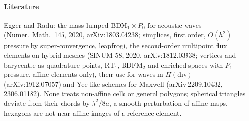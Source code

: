\documentclass[11pt,a4paper]{article}
\begin{document}
\paragraph{Literature} Egger and Radu: the mass-lumped $\mathrm{BDM}_1\times P_0$ for acoustic waves
(Numer.\ Math.\ 145, 2020, arXiv:1803.04238; simplices, first order, $O(h^2)$ pressure by
super-convergence, leapfrog), the second-order multipoint flux elements on hybrid meshes (SINUM 58, 2020,
arXiv:1812.03938; vertices and barycentre as quadrature points, $\mathrm{RT}_1$, $\mathrm{BDFM}_2$ and
enriched spaces with $P_1$ pressure, affine elements only), their use for waves in $H(\mathrm{div})$
(arXiv:1912.07057) and Yee-like schemes for Maxwell (arXiv:2209.10432, 2306.01182). None treats
non-affine cells or general polygons; spherical triangles deviate from their chords by $h^2/8a$, a
smooth perturbation of affine maps, hexagons are not near-affine images of a reference element.
\end{document}
